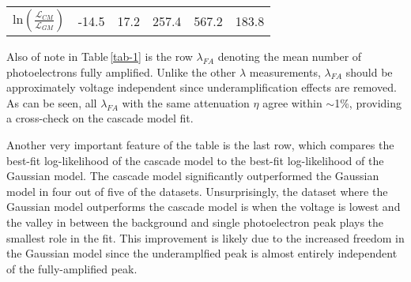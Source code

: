 \documentclass[11pt,a4paper]{article}
\newcommand\tabref[1]{Table\,\ref{#1}}
\begin{document}
\begin{table*}[b]
{\begin{tabular}{cc|ccccc}
\multicolumn{2}{c|}{$\textrm{ln} \left( \frac{\mathcal{L}_{CM}}{\mathcal{L}_{GM}} \right)$} & -14.5 & 17.2 & 257.4 & 567.2 & 183.8 \\


\end{tabular}
}
\end{table*}



Also of note in \tabref{tab-1} is the row $\lambda_{FA}$ denoting the mean number of photoelectrons fully amplified.  Unlike the other $\lambda$ measurements, $\lambda_{FA}$ should be approximately voltage independent since underamplification effects are removed.  As can be seen, all $\lambda_{FA}$ with the same attenuation $\eta$ agree within $\sim$1\%, providing a cross-check on the cascade model fit.

Another very important feature of the table is the last row, which compares the best-fit log-likelihood of the cascade model to the best-fit log-likelihood of the Gaussian model.  The cascade model significantly outperformed the Gaussian model in four out of five of the datasets.  Unsurprisingly, the dataset where the Gaussian model outperforms the cascade model is when the voltage is lowest and the valley in between the background and single photoelectron peak plays the smallest role in the fit.  This improvement is likely due to the increased freedom in the Gaussian model since the underamplfied peak is almost entirely independent of the fully-amplified peak.
\end{document}

